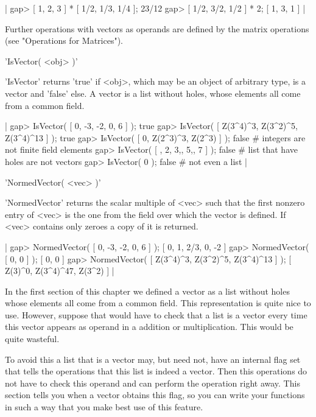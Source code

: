 |    gap> [ 1, 2, 3 ] * [ 1/2, 1/3, 1/4 ];
    23/12
    gap> [ 1/2, 3/2, 1/2 ] * 2;
    [ 1, 3, 1 ] |

Further operations  with vectors  as operands  are defined  by the matrix
operations (see "Operations for Matrices").

%

'IsVector( <obj> )'

'IsVector' returns  'true' if <obj>, which may  be an object of arbitrary
type,  is a vector and 'false'  else.  A vector  is a list without holes,
whose elements all come from a common field.

|    gap> IsVector( [ 0, -3, -2, 0, 6 ] );
    true
    gap> IsVector( [ Z(3^4)^3, Z(3^2)^5, Z(3^4)^13 ] );
    true
    gap> IsVector( [ 0, Z(2^3)^3, Z(2^3) ] );
    false    # integers are not finite field elements
    gap> IsVector( [ , 2, 3,, 5,, 7 ] );
    false    # list that have holes are not vectors
    gap> IsVector( 0 );
    false    # not even a list |

%

'NormedVector( <vec> )'

'NormedVector' returns the scalar  multiple of <vec>  such that the first
nonzero entry of <vec> is the one from the field over which the vector is
defined.  If <vec> contains only zeroes a copy of it is returned.

|    gap> NormedVector( [ 0, -3, -2, 0, 6 ] );
    [ 0, 1, 2/3, 0, -2 ]
    gap> NormedVector( [ 0, 0 ] );
    [ 0, 0 ]
    gap> NormedVector( [ Z(3^4)^3, Z(3^2)^5, Z(3^4)^13 ] );
    [ Z(3)^0, Z(3^4)^47, Z(3^2) ] |


In  the  first section of this  chapter  we defined  a  vector  as a list
without  holes   whose  elements  all come  from  a   common field.  This
representation is quite nice to  use.  However, suppose that {\GAP} would
have to check that a list is a  vector every time  this vector appears as
operand in a addition or multiplication.  This would be quite wasteful.

To avoid this a list that is a vector may, but need not, have an internal
flag set that  tells the operations that  this  list is  indeed a vector.
Then this operations do not  have to check  this operand and can  perform
the operation  right away.  This section  tells you when a vector obtains
this flag, so  you can write your  functions in such  a way that you make
best use of this feature.

